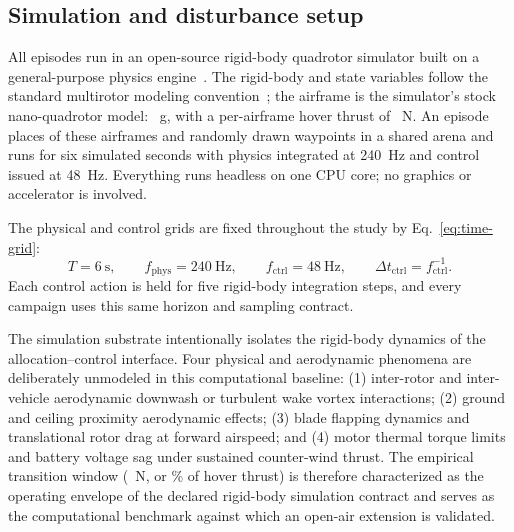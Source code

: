 
\subsection{Simulation and disturbance setup}

All episodes run in an open-source rigid-body quadrotor simulator built on a
general-purpose physics engine~\cite{panerati2021gym,coumans2016pybullet,
ozturk2025mrtasim}. The
rigid-body and state variables follow the standard multirotor modeling
convention~\cite{mahony2012multirotor}; the airframe is the simulator's stock
nano-quadrotor model: \DroneMass{}~g, with a
per-airframe hover thrust of \HoverThrust{}~N. An episode places \NDrones{} of these
airframes and \NDrones{} randomly drawn waypoints in a shared arena and runs for six
simulated seconds with physics integrated at 240~Hz and control issued at 48~Hz.
Everything runs headless on one CPU core; no graphics or accelerator is involved.

The physical and control grids are fixed throughout the study by
Eq.~\eqref{eq:time-grid}:
\begin{equation}
  T=6~\mathrm{s},\qquad f_{\mathrm{phys}}=240~\mathrm{Hz},\qquad
  f_{\mathrm{ctrl}}=48~\mathrm{Hz},\qquad
  \Delta t_{\mathrm{ctrl}}=f_{\mathrm{ctrl}}^{-1} .
  \label{eq:time-grid}
\end{equation}
Each control action is held for five rigid-body integration steps, and every
campaign uses this same horizon and sampling contract.

The simulation substrate intentionally isolates the rigid-body dynamics of the
allocation--control interface. Four physical and aerodynamic phenomena are
deliberately unmodeled in this computational baseline:
(1) inter-rotor and inter-vehicle aerodynamic downwash or turbulent wake vortex
interactions;
(2) ground and ceiling proximity aerodynamic effects;
(3) blade flapping dynamics and translational rotor drag at forward airspeed; and
(4) motor thermal torque limits and battery voltage sag under sustained counter-wind
thrust.
The empirical transition window (\KneeLevel{}~N, or \KneePctHover{}\% of hover thrust)
is therefore characterized as the operating envelope of the declared
rigid-body simulation contract and serves as the computational benchmark
against which an open-air extension is validated.

